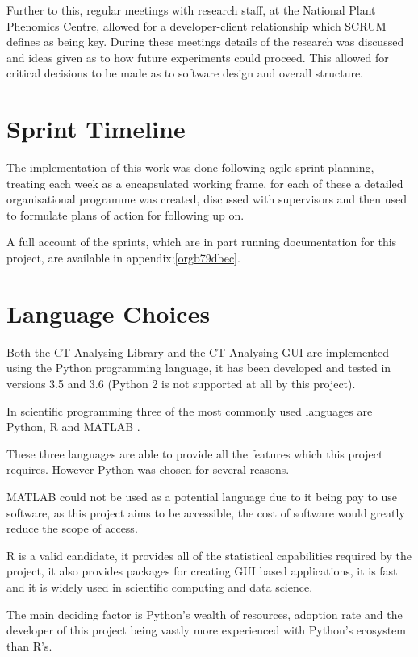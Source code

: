 \documentclass[11pt]{report}
\begin{document}
Further to this, regular meetings with research staff, at the National Plant Phenomics Centre,  allowed for a developer-client relationship which SCRUM defines as being key. During these meetings details of the research was discussed and ideas given as to how future experiments could proceed. This allowed for critical decisions to be made as to software design and overall structure.
\section{Sprint Timeline}
\label{sec:org7f078c0}
The implementation of this work was done following agile sprint planning, treating each week as a encapsulated working frame, for each of these a detailed organisational programme was created, discussed with supervisors and then used to formulate plans of action for following up on.

A full account of the sprints, which are in part running documentation for this project, are available in appendix:\ref{orgb79dbec}.

\section{Language Choices}
\label{sec:org7b818e4}
Both the CT Analysing Library and the CT Analysing GUI are implemented using the Python programming language, it has been developed and tested in versions 3.5 and 3.6 (Python 2 is not supported at all by this project).

In scientific programming three of the most commonly used languages are Python, R and MATLAB \cite{Ozgur2016}.

These three languages are able to provide all the features which this project requires. However Python was chosen for several reasons.

MATLAB could not be used as a potential language due to it being pay to use software, as this project aims to be accessible, the cost of software would greatly reduce the scope of access.

R is a valid candidate, it provides all of the statistical capabilities required by the project, it also provides packages for creating GUI based applications, it is fast and it is widely used in scientific computing and data science.

The main deciding factor is Python's wealth of resources, adoption rate and the developer of this project being vastly more experienced with Python's ecosystem than R's.
\end{document}
